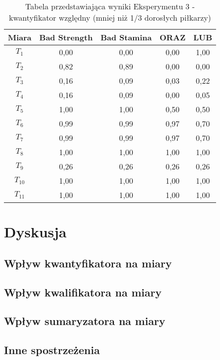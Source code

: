 \documentclass{classrep}
\begin{document}
\begin{table}[H]
	\centering
	\begin{tabular}{c c c c c } 
		\hline
		\textbf{Miara} & \textbf{Bad Strength} & \textbf{Bad Stamina} & \textbf{ORAZ} & \textbf{LUB}\\ [0.5ex] 
		\hline
		\hline 
            $T_1$ & 0,00 & 0,00 & 0,00 & 1,00\\
            $T_2$ & 0,82 & 0,89 & 0,00 & 0,00\\
            $T_3$ & 0,16 & 0,09 & 0,03 & 0,22\\
            $T_4$ & 0,16 & 0,09 & 0,00 & 0,05\\
            $T_5$ & 1,00 & 1,00 & 0,50 & 0,50\\
            $T_6$ & 0,99 & 0,99 & 0,97 & 0,70\\
            $T_7$ & 0,99 & 0,99 & 0,97 & 0,70\\
            $T_8$ & 1,00 & 1,00 & 1,00 & 1,00\\
            $T_9$ & 0,26 & 0,26 & 0,26 & 0,26\\
            $T_{10}$ & 1,00 & 1,00 & 1,00 & 1,00\\
            $T_{11}$ & 1,00 & 1,00 & 1,00 & 1,00\\
		\hline
	\end{tabular}
	\caption{Tabela przedstawiająca wyniki Eksperymentu 3 - kwantyfikator względny (mniej niż 1/3 dorosłych piłkarzy)}
\end{table}

\section{Dyskusja}

\subsection{Wpływ kwantyfikatora na miary}

\subsection{Wpływ kwalifikatora na miary}

\subsection{Wpływ sumaryzatora na miary}

\subsection{Inne spostrzeżenia}
\end{document}
